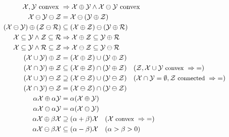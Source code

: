 \begin{align}
\X,\Y\text{ convex } &\Rightarrow \X\oplus\Y\wedge\X\ominus\Y \text{convex}\label{eq:convexity:of:minkowski:sum}\\
\X\ominus\Y\ominus\Z &= \X\ominus(\Y\oplus\Z)\label{eq:zusammenfassung:pontryagin:difference}\\
(\X\ominus\Y)\oplus(\Z\ominus\mathcal R)&\subseteq(\X\oplus\Z)\ominus(\Y\oplus\mathcal R)\label{eq:Hadwiger:identity:26}\\
\X\subseteq\Y\wedge\Z\subseteq\mathcal R&\Rightarrow \X\oplus\Z\subseteq\Y\oplus\mathcal R\label{eq:Hadwiger:monotonie}\\
\X\subseteq\Y\wedge\mathcal R\subseteq\Z&\Rightarrow \X\ominus\Z\subseteq\Y\ominus\mathcal R\label{eq:Hadwiger:identity:28}\\
(\X\cup\Y)\oplus\Z &= (\X\oplus\Z)\cup(\Y\oplus\Z)\label{eq:Hadwiger:identity:29}\\
(\X\cap\Y)\oplus\Z &\subseteq (\X\oplus\Z)\cap(\Y\oplus\Z)\quad{\footnotesize{(\Z,\X\cup\Y\text{ convex }\Rightarrow\;=)}}\label{eq:Hadwiger:identity:30}\\
(\X\cup\Y)\ominus\Z &\supseteq (\X\ominus\Z)\cup(\Y\ominus\Z)\quad{\footnotesize{(\X\cap\Y=\emptyset,\Z\text{ connected }\Rightarrow\;=)}}\label{eq:Hadwiger:identity:31}\\
(\X\cap\Y)\ominus\Z &=(\X\ominus\Z)\cap(\Y\ominus\Z)\label{eq:Hadwiger:identity:32}\\
\alpha\X\oplus\alpha\Y&=\alpha(\X\oplus\Y)\label{eq:Hadwiger:identity:35}\\
\alpha\X\ominus\alpha\Y&= \alpha(\X\ominus\Y)\label{eq:Hadwiger:identity:36}\\
\alpha\X\oplus\beta\X&\supseteq(\alpha+\beta)\X\quad{\footnotesize{(\X\text{ convex }\Rightarrow\; =)}} \label{eq:Hadwiger:identity:37}\\
\alpha\X\ominus\beta\X&\subseteq(\alpha-\beta)\X\quad{\footnotesize{(\alpha>\beta>0)}}\label{eq:Hadwiger:identity:38}\\
\end{align}
%
%
